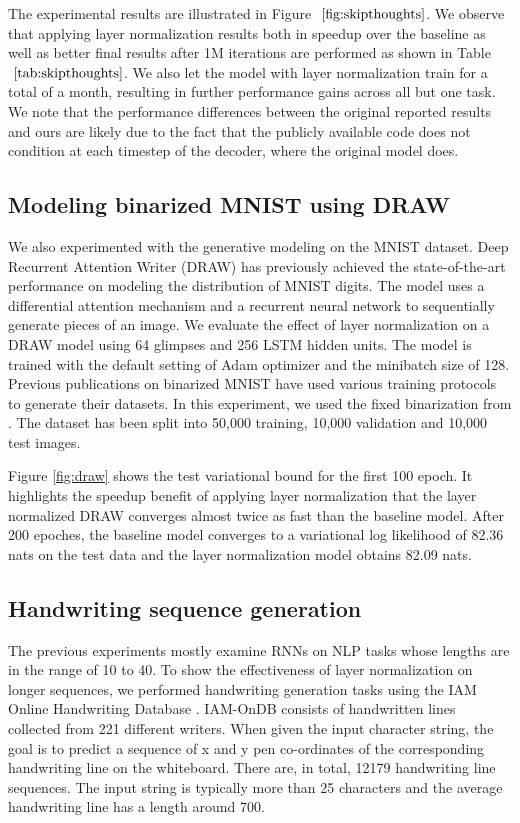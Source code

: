 The experimental results are illustrated in Figure $~\ref{fig:skipthoughts}$. We observe that applying layer normalization results both in speedup over the baseline as well as better final results after 1M iterations are performed as shown in Table $~\ref{tab:skipthoughts}$. We also let the model with layer normalization train for a total of a month, resulting in further performance gains across all but one task. We note that the performance differences between the original reported results and ours are likely due to the fact that the publicly available code does not condition at each timestep of the decoder, where the original model does.

\subsection{Modeling binarized MNIST using DRAW}

We also experimented with the generative modeling on the MNIST dataset.  Deep Recurrent Attention Writer (DRAW) \citep{draw} has previously achieved the state-of-the-art performance on modeling the distribution of MNIST digits. The model uses a differential attention mechanism and a recurrent neural network to sequentially generate pieces of an image. We evaluate the effect of layer normalization on a DRAW model using 64 glimpses and 256 LSTM hidden units. The model is trained with the default setting of Adam \citep{adam} optimizer and the minibatch size of 128. Previous publications on binarized MNIST have used various training protocols to generate their datasets. In this experiment, we used the fixed binarization from \citet{hugobmnist}. The dataset has been split into 50,000 training, 10,000 validation and 10,000 test images.

Figure \ref{fig:draw} shows the test variational bound for the first 100 epoch. It highlights the speedup benefit of applying layer normalization that the layer normalized DRAW converges almost twice as fast than the baseline model. After 200 epoches, the baseline model converges to a variational log likelihood of 82.36 nats  on the test data and the layer normalization model obtains 82.09 nats.

\subsection{Handwriting sequence generation}

The previous experiments mostly examine RNNs on NLP tasks whose lengths are in the range of 10 to 40. To show the effectiveness of layer normalization on longer sequences, we performed handwriting generation tasks using the IAM Online Handwriting Database \citep{liwicki2005iam}. IAM-OnDB consists of handwritten lines collected from 221 different writers. When given the input character string, the goal is to predict a sequence of x and y pen co-ordinates of the corresponding handwriting line on the whiteboard. There are, in total, 12179 handwriting line sequences. The input string is typically more than 25 characters and the average handwriting line has a length around 700.  

